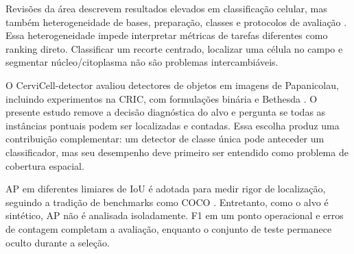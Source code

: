 Revis\~oes da \'area descrevem resultados elevados em classifica\c{c}\~ao celular,
mas tamb\'em heterogeneidade de bases, prepara\c{c}\~ao, classes e protocolos de
avalia\c{c}\~ao \cite{jiang2023systematic,fang2024systematic}. Essa heterogeneidade
impede interpretar m\'etricas de tarefas diferentes como ranking direto.
Classificar um recorte centrado, localizar uma c\'elula no campo e segmentar
n\'ucleo/citoplasma n\~ao s\~ao problemas intercambi\'aveis.

O CerviCell-detector avaliou detectores de objetos em imagens de Papanicolau,
incluindo experimentos na CRIC, com formula\c{c}\~oes bin\'aria e Bethesda
\cite{kalbhor2023cervicell}. O presente estudo remove a decis\~ao diagn\'ostica do
alvo e pergunta se todas as inst\^ancias pontuais podem ser localizadas e
contadas. Essa escolha produz uma contribui\c{c}\~ao complementar: um detector de
classe \'unica pode anteceder um classificador, mas seu desempenho deve primeiro
ser entendido como problema de cobertura espacial.

AP em diferentes limiares de IoU \'e adotada para medir rigor de localiza\c{c}\~ao,
seguindo a tradi\c{c}\~ao de benchmarks como COCO \cite{lin2014coco}. Entretanto,
como o alvo \'e sint\'etico, AP n\~ao \'e analisada isoladamente. F1 em um ponto
operacional e erros de contagem completam a avalia\c{c}\~ao, enquanto o conjunto
de teste permanece oculto durante a sele\c{c}\~ao.
